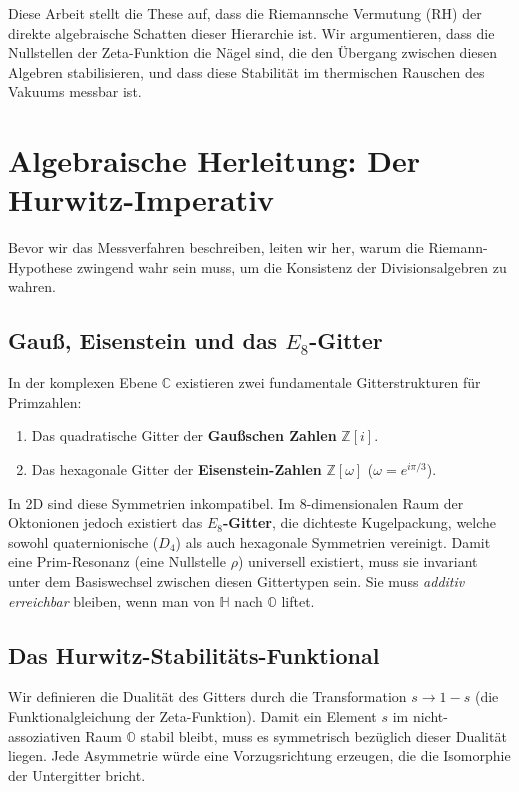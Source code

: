 \documentclass[11pt, a4paper]{article}
\begin{document}
	Diese Arbeit stellt die These auf, dass die Riemannsche Vermutung (RH) der direkte algebraische Schatten dieser Hierarchie ist. Wir argumentieren, dass die Nullstellen der Zeta-Funktion die \glqq Nägel\grqq{} sind, die den Übergang zwischen diesen Algebren stabilisieren, und dass diese Stabilität im thermischen Rauschen des Vakuums messbar ist.
	
	\section{Algebraische Herleitung: Der Hurwitz-Imperativ}
	
	Bevor wir das Messverfahren beschreiben, leiten wir her, warum die Riemann-Hypothese zwingend wahr sein muss, um die Konsistenz der Divisionsalgebren zu wahren.
	
	\subsection{Gauß, Eisenstein und das $E_8$-Gitter}
	In der komplexen Ebene $\mathbb{C}$ existieren zwei fundamentale Gitterstrukturen für Primzahlen:
	\begin{enumerate}
		\item Das quadratische Gitter der \textbf{Gaußschen Zahlen} $\mathbb{Z}[i]$.
		\item Das hexagonale Gitter der \textbf{Eisenstein-Zahlen} $\mathbb{Z}[\omega]$ ($\omega = e^{i\pi/3}$).
	\end{enumerate}
	In 2D sind diese Symmetrien inkompatibel. Im 8-dimensionalen Raum der Oktonionen jedoch existiert das \textbf{$E_8$-Gitter}, die dichteste Kugelpackung, welche sowohl quaternionische ($D_4$) als auch hexagonale Symmetrien vereinigt.
	Damit eine \glqq Prim-Resonanz\grqq{} (eine Nullstelle $\rho$) universell existiert, muss sie invariant unter dem Basiswechsel zwischen diesen Gittertypen sein. Sie muss \textit{additiv erreichbar} bleiben, wenn man von $\mathbb{H}$ nach $\mathbb{O}$ liftet.
	
	\subsection{Das Hurwitz-Stabilitäts-Funktional}
	Wir definieren die Dualität des Gitters durch die Transformation $s \to 1-s$ (die Funktionalgleichung der Zeta-Funktion). Damit ein Element $s$ im nicht-assoziativen Raum $\mathbb{O}$ stabil bleibt, muss es symmetrisch bezüglich dieser Dualität liegen. Jede Asymmetrie würde eine Vorzugsrichtung erzeugen, die die Isomorphie der Untergitter bricht.
	
\end{document}
